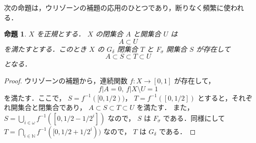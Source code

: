 \documentclass[leqno, 12pt]{ltjsarticle}
\newtheorem{prop}[thm]{命題}
\newcommand{\nn}{\mathbb{N}}
\begin{document}
次の命題は，ウリゾーンの補題の応用のひとつであり，断りなく頻繁に使われる．
\begin{prop}\label{FG}
$X$
を正規とする．
$X$
の閉集合
$A$
と開集合
$U$
は
\[
A\subset U
\]
を満たすとする．このとき
$X$
の
$G_{\delta}$
閉集合
$T$
と
$F_{\sigma}$
開集合
$S$
が存在して
\[
A\subset S\subset T\subset U
\]
となる．
\end{prop}
\begin{proof}
ウリゾーンの補題から，連続関数
$f:X\to [0,1]$
が存在して，
\[
f|A=0,\ f|X\setminus U=1
\]
を満たす．ここで，
$S=f^{-1}([0,1/2))$，
$T=f^{-1}([0,1/2])$
とすると，それぞれ開集合と閉集合であり，
$A\subset S\subset T\subset U$
を満たす．
また，
$S=\bigcup_{i\in \omega}f^{-1}([0,1/2-1/2^{i}])$
なので，
$S$
は
$F_{\sigma}$
である．同様にして
$T=\bigcap_{i\in\nn}f^{-1}([0,1/2+1/2^{i}))$
なので，
$T$
は
$G_{\delta}$
である．

\end{proof}
\end{document}
